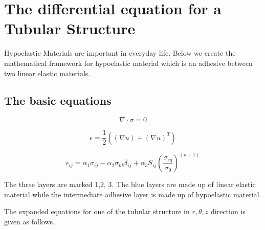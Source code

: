\documentclass[11pt]{article} %
\begin{document}
\section{The differential equation for a Tubular Structure}

Hypoelastic Materials are important in everyday life. Below we create the mathematical framework for hypoelastic material which is an adhesive between two linear elastic materials.


\subsection{The basic equations}

	\begin{equation}
	\nabla \cdot \sigma  = 0 
	\end{equation}

	\begin{equation}
	\epsilon = \frac{1}{2}((\nabla u) + (\nabla u)^T)
	\end{equation}

	\begin{equation}
	\epsilon_{ij} = \alpha_1{\sigma_{ij}} - \alpha_2 {\sigma_{kk}} \delta_{ij} + \alpha_3 S_{ij}(\frac{\sigma_{eq}}{\sigma_{0}})^{(n-1)}
	\end{equation}

	\begin{figure}[htp] 
	\caption{}
	\end{figure}

	The three layers are marked 1,2, 3. The blue layers are made up of linear elastic material while the intermediate adhesive layer is made up of hypoelastic material. 
	
	The expanded equations for one of the tubular structure in $ r , \theta, z $ direction is given as follows.
	
\end{document}
